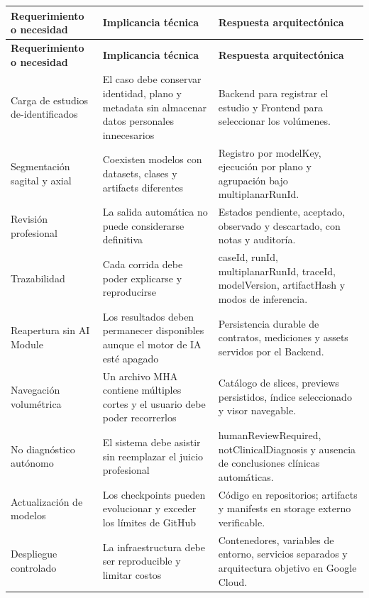 {\footnotesize
\setlength{\LTleft}{0pt}
\setlength{\LTright}{0pt}
\setlength{\tabcolsep}{2pt}
\renewcommand{\arraystretch}{1.18}
\label{tab:arch-decisiones-requerimientos}
\begin{longtable}{>{\raggedright\arraybackslash}p{} >{\raggedright\arraybackslash}p{} >{\raggedright\arraybackslash}p{}}
\hline
\textbf{Requerimiento o necesidad} & \textbf{Implicancia técnica} & \textbf{Respuesta arquitectónica} \\
\hline
\endfirsthead
\hline
\textbf{Requerimiento o necesidad} & \textbf{Implicancia técnica} & \textbf{Respuesta arquitectónica} \\
\hline
\endhead
\hline
\endfoot
Carga de estudios de-identificados & El caso debe conservar identidad, plano y metadata sin almacenar datos personales innecesarios & Backend para registrar el estudio y Frontend para seleccionar los volúmenes. \\
Segmentación sagital y axial & Coexisten modelos con datasets, clases y artifacts diferentes & Registro por modelKey, ejecución por plano y agrupación bajo multiplanarRunId. \\
Revisión profesional & La salida automática no puede considerarse definitiva & Estados pendiente, aceptado, observado y descartado, con notas y auditoría. \\
Trazabilidad & Cada corrida debe poder explicarse y reproducirse & caseId, runId, multiplanarRunId, traceId, modelVersion, artifactHash y modos de inferencia. \\
Reapertura sin AI Module & Los resultados deben permanecer disponibles aunque el motor de IA esté apagado & Persistencia durable de contratos, mediciones y assets servidos por el Backend. \\
Navegación volumétrica & Un archivo MHA contiene múltiples cortes y el usuario debe poder recorrerlos & Catálogo de slices, previews persistidos, índice seleccionado y visor navegable. \\
No diagnóstico autónomo & El sistema debe asistir sin reemplazar el juicio profesional & humanReviewRequired, notClinicalDiagnosis y ausencia de conclusiones clínicas automáticas. \\
Actualización de modelos & Los checkpoints pueden evolucionar y exceder los límites de GitHub & Código en repositorios; artifacts y manifests en storage externo verificable. \\
Despliegue controlado & La infraestructura debe ser reproducible y limitar costos & Contenedores, variables de entorno, servicios separados y arquitectura objetivo en Google Cloud. \\
\hline
\end{longtable}
}

